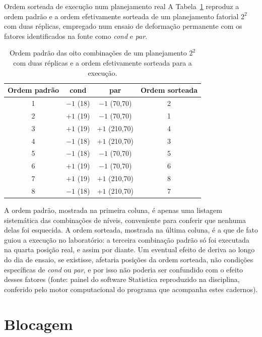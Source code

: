 \documentclass{doeapostila}
\begin{document}
\begin{aplicacao}{Ordem sorteada de execução num planejamento real}
  A Tabela~\ref{tab:aleatorizacao} reproduz a ordem padrão e a ordem
  efetivamente sorteada de um planejamento fatorial $2^{2}$ com duas
  réplicas, empregado num ensaio de deformação permanente com os fatores
  identificados na fonte como \emph{cond} e \emph{par}.

  \begin{table}[H]
    \centering
    \caption{Ordem padrão das oito combinações de um planejamento $2^{2}$
      com duas réplicas e a ordem efetivamente sorteada para a execução.}
    \label{tab:aleatorizacao}
    \begin{tabular}{c c c c}
      \toprule
      {Ordem padrão} & {cond} & {par} & {Ordem sorteada} \\
      \midrule
      1 & $-1$ (18) & $-1$ (70,70)  & 2 \\
      2 & $+1$ (19) & $-1$ (70,70)  & 1 \\
      3 & $+1$ (19) & $+1$ (210,70) & 4 \\
      4 & $-1$ (18) & $+1$ (210,70) & 3 \\
      5 & $-1$ (18) & $-1$ (70,70)  & 5 \\
      6 & $+1$ (19) & $-1$ (70,70)  & 6 \\
      7 & $+1$ (19) & $+1$ (210,70) & 8 \\
      8 & $-1$ (18) & $+1$ (210,70) & 7 \\
      \bottomrule
    \end{tabular}
  \end{table}

  A ordem padrão, mostrada na primeira coluna, é apenas uma listagem
  sistemática das combinações de níveis, conveniente para conferir que
  nenhuma delas foi esquecida. A ordem sorteada, mostrada na última coluna,
  é a que de fato guiou a execução no laboratório: a terceira combinação
  padrão só foi executada na quarta posição real, e assim por diante. Um
  eventual efeito de deriva ao longo do dia de ensaio, se existisse,
  afetaria posições da ordem sorteada, não condições específicas de
  \emph{cond} ou \emph{par}, e por isso não poderia ser confundido com o
  efeito desses fatores (fonte: painel do software Statistica reproduzido
  na disciplina, conferido pelo motor computacional do programa que
  acompanha estes cadernos).
\end{aplicacao}

\section{Blocagem}
\label{sec:blocagem}
\end{document}
